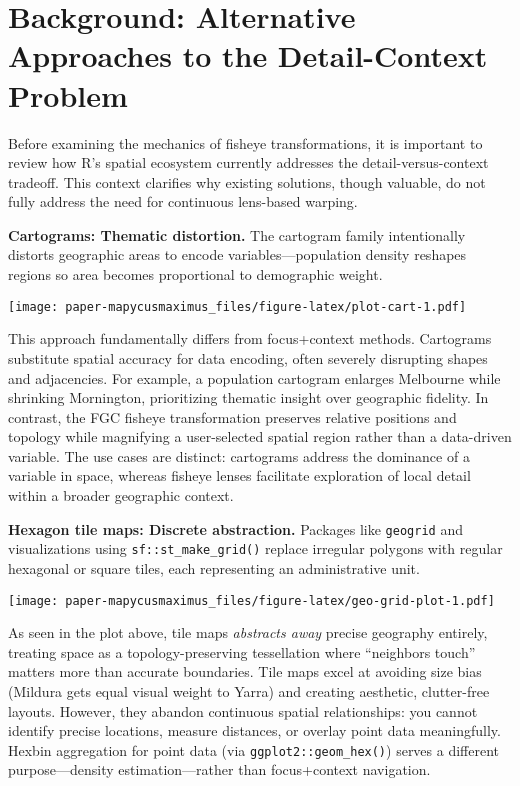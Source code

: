 \hypertarget{background-alternative-approaches-to-the-detail-context-problem}{%
\section{Background: Alternative Approaches to the Detail-Context Problem}\label{background-alternative-approaches-to-the-detail-context-problem}}

Before examining the mechanics of fisheye transformations, it is important to review how R's spatial ecosystem currently addresses the detail-versus-context tradeoff. This context clarifies why existing solutions, though valuable, do not fully address the need for continuous lens-based warping.

\textbf{Cartograms: Thematic distortion.} The cartogram family \citep{gastner2004} intentionally distorts geographic areas to encode variables---population density reshapes regions so area becomes proportional to demographic weight.

\texttt{[image: paper-mapycusmaximus\_files/figure-latex/plot-cart-1.pdf]}

This approach fundamentally differs from focus+context methods. Cartograms substitute spatial accuracy for data encoding, often severely disrupting shapes and adjacencies. For example, a population cartogram enlarges Melbourne while shrinking Mornington, prioritizing thematic insight over geographic fidelity. In contrast, the FGC fisheye transformation preserves relative positions and topology while magnifying a user-selected spatial region rather than a data-driven variable. The use cases are distinct: cartograms address the dominance of a variable in space, whereas fisheye lenses facilitate exploration of local detail within a broader geographic context.

\textbf{Hexagon tile maps: Discrete abstraction.} Packages like \texttt{geogrid} and visualizations using \texttt{sf::st\_make\_grid()} replace irregular polygons with regular hexagonal or square tiles, each representing an administrative unit.

\texttt{[image: paper-mapycusmaximus\_files/figure-latex/geo-grid-plot-1.pdf]}

As seen in the plot above, tile maps \emph{abstracts away} precise geography entirely, treating space as a topology-preserving tessellation where ``neighbors touch'' matters more than accurate boundaries. Tile maps excel at avoiding size bias (Mildura gets equal visual weight to Yarra) and creating aesthetic, clutter-free layouts. However, they abandon continuous spatial relationships: you cannot identify precise locations, measure distances, or overlay point data meaningfully. Hexbin aggregation for point data (via \texttt{ggplot2::geom\_hex()}) serves a different purpose---density estimation---rather than focus+context navigation.

